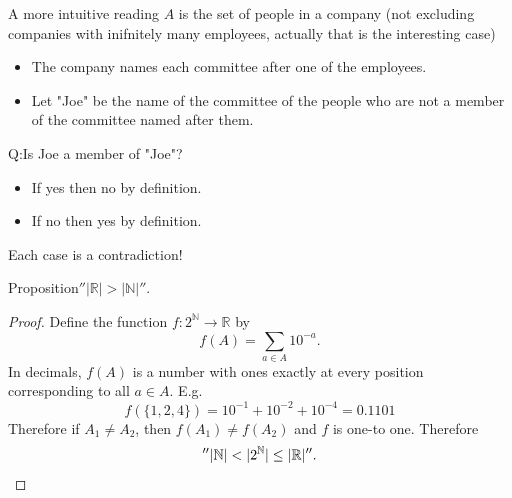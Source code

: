 \documentclass{beamer}
\def\bl[#1]#2{\begin{block}{#1}#2\end{block}}
\begin{document}
\begin{frame}{A more intuitive reading}
$A$ is the set of people in a company (not excluding companies with inifnitely many employees, actually that is the interesting case)
\begin{itemize}
\item The company names each committee after one of the employees.
\item Let "Joe" be the name of the committee of the people who are not a member of the committee named after them.
\end{itemize}
\bl[]{Q:Is Joe a member of "Joe"?}

\begin{itemize}
\item If yes then no by definition.
\item If no then yes by definition.
\end{itemize}
Each case is a contradiction!



\end{frame}

\begin{frame}
\bl[Proposition]{$''|\mathbb{R}|>|\mathbb{N}|''$.}

\begin{proof}
Define the function $f:2^{\mathbb{N}}\to\mathbb{R}$ by
\[
f(A)=\sum_{a\in A}10^{-a}.
\]
In decimals, $f(A)$ is a number with ones exactly at every position corresponding to all $a\in A$. E.g.
\[
f(\{1,2,4\})=10^{-1}+10^{-2}+10^{-4}=0.1101
\]
Therefore if $A_1\neq A_2$, then $f(A_1)\neq f(A_2)$ and $f$ is one-to one. Therefore
\[
''|\mathbb{N}|<|2^{\mathbb{N}}|\leq|\mathbb{R}|''.\qedhere
\]
\end{proof}
\end{frame}
\end{document}

